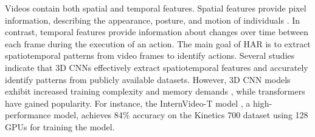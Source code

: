 \documentclass[mathematics,article,submit,pdftex,moreauthors]{Definitions/mdpi}
\begin{document}

Videos contain both spatial and temporal features. Spatial features provide pixel information, describing the appearance, posture, and motion of individuals \cite{s19051005}. In contrast, temporal features provide information about changes over time between each frame during the execution of an action. The main goal of HAR is to extract spatiotemporal patterns from video frames to identify actions. %
Several studies indicate that 3D CNNs effectively extract spatiotemporal features and accurately identify patterns from publicly available datasets. However, 3D CNN models exhibit increased training complexity and memory demands \cite{Pareek2021-zg}, while transformers have gained popularity. For instance, the InternVideo-T model \cite{wang2022internvideo}, a high-performance model, achieves 84\% accuracy on the Kinetics 700 dataset \cite{smaira2020short} using 128 GPUs for training the model.
\end{document}
